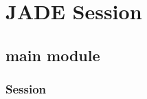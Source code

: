 \documentclass[letterpaper,10pt,english]{sphinxmanual}
\begin{document}
\chapter{JADE Session}
\label{\detokenize{api/initobjects:jade-session}}\label{\detokenize{api/initobjects::doc}}

\section{main module}
\label{\detokenize{api/initobjects:main-module}}

\subsection{Session}
\label{\detokenize{api/initobjects:session}}\label{\detokenize{api/initobjects:sessionob}}
\end{document}
